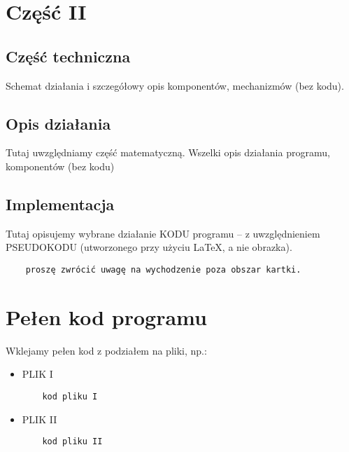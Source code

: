 \documentclass[12pt,a4paper]{article}
\begin{document}
\newpage
	\section*{Część II}
	\subsection*{Część techniczna}
	Schemat działania i szczegółowy opis komponentów, mechanizmów (bez kodu).
	\subsection*{Opis działania} 
	Tutaj uwzględniamy część matematyczną. Wszelki opis działania programu, komponentów (bez kodu)
	\subsection*{Implementacja}
	Tutaj opisujemy wybrane działanie KODU programu -- z uwzględnieniem PSEUDOKODU (utworzonego przy użyciu \LaTeX, a nie obrazka).
	\begin{verbatim}
	proszę zwrócić uwagę na wychodzenie poza obszar kartki.
	\end{verbatim}
	\newpage
	\section*{Pełen kod programu}

	Wklejamy pełen kod z podziałem na pliki, np.:
	
	\begin{itemize}
	\item PLIK I
	\begin{verbatim}
	kod pliku I
	\end{verbatim}
	\item PLIK II
	\begin{verbatim}
	kod pliku II
	\end{verbatim}
	\end{itemize}
\end{document}
